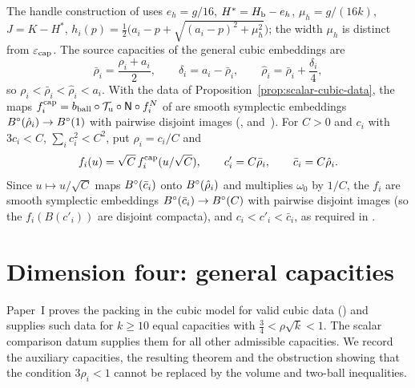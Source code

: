The handle construction of  uses $e_h=g/16$, $H^*=H_{\mathrm b}-e_h$, $\mu_h=g/(16k)$, $J=K-H^*$, $h_i(p)=\tfrac12\bigl(a_i-p+\sqrt{(a_i-p)^2+\mu_h^2}\bigr)$; the width $\mu_h$ is distinct from $\varepsilon_{\rm cap}$. The source capacities of the general cubic embeddings are
\begin{equation}\label{eq:scalar-enlargement}
 \bar\rho_i=\frac{\rho_i+a_i}{2},\qquad
 \delta_i=a_i-\bar\rho_i,\qquad \hat\rho_i=\bar\rho_i+\frac{\delta_i}{4},
\end{equation}
so $\rho_i<\bar\rho_i<\hat\rho_i<a_i$. With the data of Proposition~\ref{prop:scalar-cubic-data}, the maps $f_i^{\rm cap}=b_{\rm ball}\circ\mathcal T_{\rm u}\circ\mathsf N\circ f^N_i$ of  are smooth symplectic embeddings $B^{\circ}(\hat\rho_i)\to B^{\circ}(1)$ with pairwise disjoint images (,  and~). For $C>0$ and $c_i$ with $3c_i<C$, $\sum_ic_i^2<C^2$, put $\rho_i=c_i/C$ and
\begin{equation}\label{eq:scalar-cubic-scaling}
 f_i(u)=\sqrt C\, f_i^{\rm cap}(u/\sqrt C),\qquad
 c'_i=C\bar\rho_i,\qquad \bar c_i=C\hat\rho_i.
\end{equation}
Since $u\mapsto u/\sqrt C$ maps $B^{\circ}(\bar c_i)$ onto $B^{\circ}(\hat\rho_i)$ and multiplies $\omega_0$ by $1/C$, the $f_i$ are smooth symplectic embeddings $B^{\circ}(\bar c_i)\to B^{\circ}(C)$ with pairwise disjoint images (so the $f_i(B(c'_i))$ are disjoint compacta), and $c_i<c'_i<\bar c_i$, as required in .

\section{Dimension four: general capacities}\label{sec:four-general}

Paper~I proves the packing in the cubic model for valid cubic data () and supplies such data
for $k\ge10$ equal capacities with $\frac34<\rho\sqrt k<1$. The scalar comparison datum supplies them for all other
admissible capacities. We record the auxiliary capacities, the resulting theorem and the obstruction showing that
the condition $3\rho_i<1$ cannot be replaced by the volume and two-ball inequalities.


